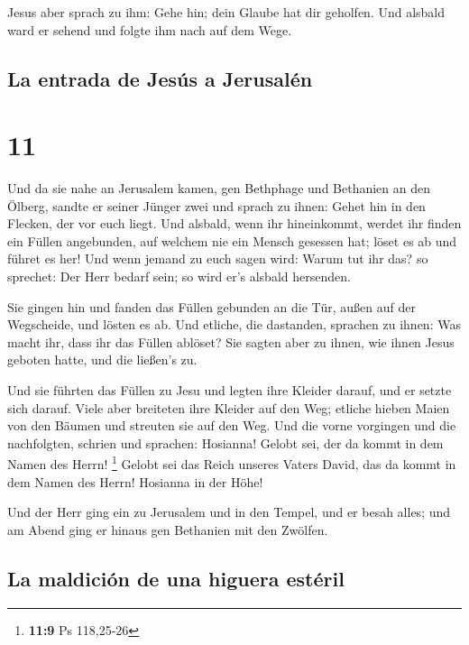  Jesus aber sprach zu ihm: Gehe hin; dein Glaube hat dir
geholfen. Und alsbald ward er sehend und folgte ihm nach auf dem Wege.

\hypertarget{la-entrada-de-jesuxfas-a-jerusaluxe9n}{%
\subsection{La entrada de Jesús a
Jerusalén}\label{la-entrada-de-jesuxfas-a-jerusaluxe9n}}

\hypertarget{section-10}{%
\section{11}\label{section-10}}

 Und da sie nahe an Jerusalem kamen, gen Bethphage und
Bethanien an den Ölberg, sandte er seiner Jünger zwei  und
sprach zu ihnen: Gehet hin in den Flecken, der vor euch liegt. Und
alsbald, wenn ihr hineinkommt, werdet ihr finden ein Füllen angebunden,
auf welchem nie ein Mensch gesessen hat; löset es ab und führet es her!
 Und wenn jemand zu euch sagen wird: Warum tut ihr das? so
sprechet: Der Herr bedarf sein; so wird er's alsbald hersenden.

 Sie gingen hin und fanden das Füllen gebunden an die Tür,
außen auf der Wegscheide, und lösten es ab.  Und etliche,
die dastanden, sprachen zu ihnen: Was macht ihr, dass ihr das Füllen
ablöset?  Sie sagten aber zu ihnen, wie ihnen Jesus
geboten hatte, und die ließen's zu.

 Und sie führten das Füllen zu Jesu und legten ihre
Kleider darauf, und er setzte sich darauf.  Viele aber
breiteten ihre Kleider auf den Weg; etliche hieben Maien von den Bäumen
und streuten sie auf den Weg.  Und die vorne vorgingen und
die nachfolgten, schrien und sprachen: Hosianna! Gelobt sei, der da
kommt in dem Namen des Herrn! \footnote{\textbf{11:9} Ps 118,25-26}
 Gelobt sei das Reich unseres Vaters David, das da kommt
in dem Namen des Herrn! Hosianna in der Höhe!

 Und der Herr ging ein zu Jerusalem und in den Tempel,
und er besah alles; und am Abend ging er hinaus gen Bethanien mit den
Zwölfen.

\hypertarget{la-maldiciuxf3n-de-una-higuera-estuxe9ril}{%
\subsection{La maldición de una higuera
estéril}\label{la-maldiciuxf3n-de-una-higuera-estuxe9ril}}

